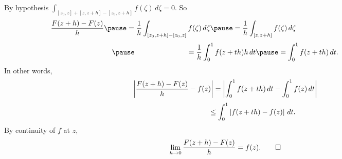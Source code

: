 \documentclass[10pt,aspectratio=169]{beamer}
\begin{document}
\begin{frame}

By hypothesis $\displaystyle \int_{[z_0,z]+[z,z+h]-[z_0,z+h]} f(\zeta) \,
d\zeta = 0 $.
\pause
So
\[
\frac{F(z+h)-F(z)}{h}
\pause
=
\frac{1}{h}
\int_{[z_0,z+h]-[z_0,z]} f(\zeta) \, d\zeta
\pause
=
\frac{1}{h}
\int_{[z,z+h]} f(\zeta) \, d\zeta
\hspace*{2.0in}
\]
\[
\pause
\hspace*{1in}
=
\frac{1}{h}
\int_0^1 f(z+th) h \, dt
\pause
=
\int_0^1 f(z+th) \, dt .
\]
\pause
\vspace*{-0.1in}
In other words,
\vspace*{-0.1in}
\[
\left\lvert {
\frac{F(z+h)-F(z)}{h} 
-
f(z)
} \right\rvert
=
\left\lvert {
\int_0^1 f(z+th) \, dt
-
\int_0^1 f(z) \, dt
} \right\rvert
\]
\pause
\vspace*{-0.05in}
\[
\hspace*{1.08in}
 \leq
\int_0^1 \left\lvert {f(z+th)-f(z)} \right\rvert \, dt .
\]
\pause
By continuity of $f$ at $z$,
\begin{equation*}
\lim_{h \to 0}
\frac{F(z+h)-F(z)}{h} 
=
f(z) . \qed
\end{equation*}

\end{frame}
\end{document}
